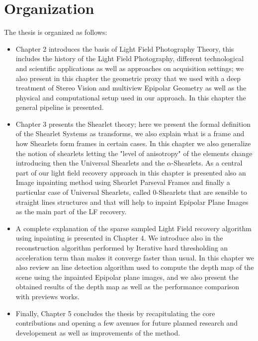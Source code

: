\section{Organization}

The thesis is organized as follows:

\begin{itemize}
\item Chapter 2 introduces the basis of Light Field Photography Theory, this includes the history of the Light Field Photography, different technological and scientific applications as well as approaches on acquisition settings; we also present in this chapter the geometric proxy that we used with a deep treatment of Stereo Vision and multiview Epipolar Geometry as well as the physical and computational setup used in our approach. In this chapter the general pipeline is presented. 

\item Chapter 3 presents the Shearlet theory; here we present the formal definition of the Shearlet Systems as transforms, we also explain what is a frame and how Shearlets form frames in certain cases. In this chapter we also generalize the notion of shearlets letting the "level of anisotropy" of the elements change introducing then the Universal Shearlets and the $\alpha$-Shearlets. As a central part of our light field recovery approach in this chapter is presented also an Image inpainting method using Shearlet Parseval Frames and finally a particular case of Universal Shearlets, called $0$-Shearlets that are sensible to straight lines structures and that will help to inpaint Epipolar Plane Images as the main part of the LF recovery. 

\item A complete explanation of the sparse sampled Light Field recovery algorithm using inpainting is presented in Chapter 4. We introduce also in the reconstruction algorithm performed by Iterative hard thresholding an acceleration term than makes it converge faster than usual. In this chapter we also review an line detection algorithm used to compute the depth map of the scene using the inpainted Epipolar plane images, and we also present the obtained results of the depth map as well as the performance comparison with previews works. 

\item Finally, Chapter 5 concludes the thesis by recapitulating the core contributions and opening a few avenues for future planned research and developement as well as improvements of the method. 
\end{itemize}
